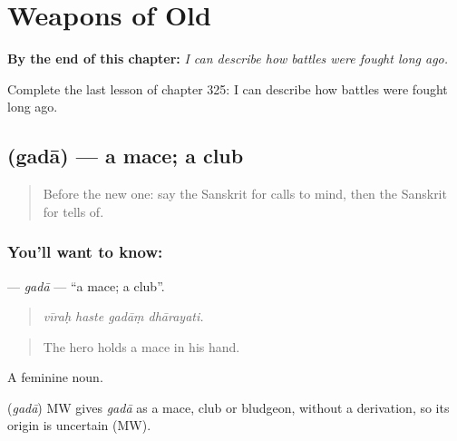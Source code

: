 
\chapter{Weapons of Old}
\label{ch:sa-weapons-of-old}

\begin{chapteropening}
\textbf{By the end of this chapter:} \emph{I can describe how battles were fought long ago.}

Complete the last lesson of chapter 325: I can describe how battles were fought long ago.
\end{chapteropening}

\section[\texorpdfstring{\sk{गदा} (gadā)}{गदा (gadā)}]{ (gadā) — a mace; a club}

\label{lesson:SA-C325-gada}



\begin{quote}
Before the new one: say the Sanskrit for calls to mind, then the Sanskrit for tells of.
\end{quote}

\subsection*{You'll want to know: }
\textbf{} — \emph{gadā} — \textquotedblleft{}a mace; a club\textquotedblright{}.

\begin{quote}
   
\end{quote}

\begin{quote}
\emph{vīraḥ haste gadāṃ dhārayati.}
\end{quote}

\begin{quote}
The hero holds a mace in his hand.
\end{quote}

A feminine noun.

\begin{cousinweb}
\textbf{} (\emph{gadā}) MW gives \emph{gadā} as a mace, club or bludgeon, without a derivation, so its origin is uncertain (MW).
\end{cousinweb}

